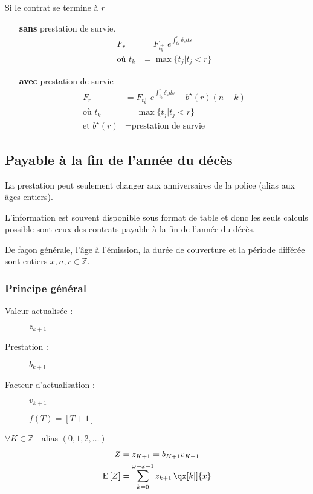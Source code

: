 \documentclass[10pt, french]{article}
\begin{document}
\begin{multicols*}{3}
Si le contrat se termine à $r$ 
\begin{enumerate}
	\item[\textbf{sans}] prestation de survie.
	\begin{align*}
	F_{r} &= F_{t_{k}^{+}} \; e^{\int_{t_{k}}^{r} \delta_s ds} \\
	\text{où } t_k &= \max \{t_j | t_j < r\} 
	\end{align*}
	\item[\textbf{avec}] prestation de survie
	\begin{align*}
	F_{r} &= F_{t_{k}^{+}} \; e^{\int_{t_{k}}^{r} \delta_s ds} - b^{\star}(r)(n - k) \\
	\text{où } t_k &= \max \{t_j | t_j < r\}  \\
	\text{et } b^{\star}(r) &= \text{prestation de survie}  
	\end{align*}
\end{enumerate}

\subsection{Payable à la fin de l'année du décès}

La prestation peut seulement changer aux anniversaires de la police (alias aux âges entiers).


L'information est souvent disponible sous format de table et donc les seuls calculs possible sont ceux des contrats payable à la fin de l'année du décès.

De façon générale, l'âge à l'émission, la durée de couverture et la période différée sont entiers $x, n, r \in \mathds{Z}$.

\subsubsection*{\textcolor{amber(sae/ece)}{Principe général}}

\begin{description}
	\item[Valeur actualisée :] $z_{k + 1}$
	\item[Prestation :] $b_{k + 1}$
	\item[Facteur d'actualisation :] $v_{k + 1}$
	\item[] $f(T) = [T + 1]$
\end{description}
$\forall K \in \mathds{Z}_+$ alias $(0, 1, 2, \dots)$
\begin{align*}
	Z 		&= z_{K + 1} = b_{K + 1} v_{K + 1} \\
	\esp{Z} &= \sum_{k = 0}^{\omega - x - 1} z_{k + 1} \, \qx[k|]{x}
\end{align*}


\end{multicols*}
\end{document}
